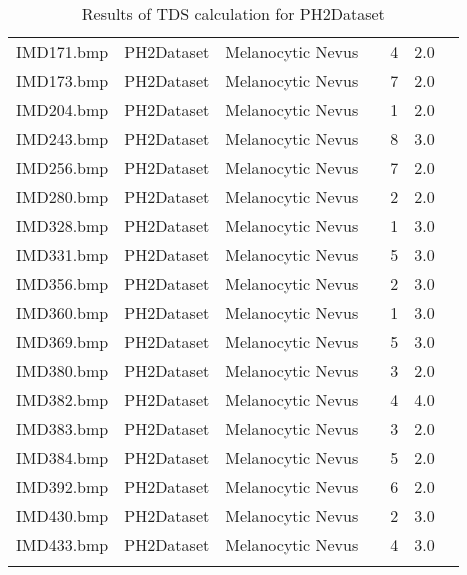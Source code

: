 \begin{longtable}{ | l | l | l | l | l | l | l |}
IMD171.bmp & PH2Dataset & Melanocytic Nevus & & 4 & 2.0 & \\
IMD173.bmp & PH2Dataset & Melanocytic Nevus & & 7 & 2.0 & \\
IMD204.bmp & PH2Dataset & Melanocytic Nevus & & 1 & 2.0 & \\
IMD243.bmp & PH2Dataset & Melanocytic Nevus & & 8 & 3.0 & \\
IMD256.bmp & PH2Dataset & Melanocytic Nevus & & 7 & 2.0 & \\
IMD280.bmp & PH2Dataset & Melanocytic Nevus & & 2 & 2.0 & \\
IMD328.bmp & PH2Dataset & Melanocytic Nevus & & 1 & 3.0 & \\
IMD331.bmp & PH2Dataset & Melanocytic Nevus & & 5 & 3.0 & \\
IMD356.bmp & PH2Dataset & Melanocytic Nevus & & 2 & 3.0 & \\
IMD360.bmp & PH2Dataset & Melanocytic Nevus & & 1 & 3.0 & \\
IMD369.bmp & PH2Dataset & Melanocytic Nevus & & 5 & 3.0 & \\
IMD380.bmp & PH2Dataset & Melanocytic Nevus & & 3 & 2.0 & \\
IMD382.bmp & PH2Dataset & Melanocytic Nevus & & 4 & 4.0 & \\
IMD383.bmp & PH2Dataset & Melanocytic Nevus & & 3 & 2.0 & \\
IMD384.bmp & PH2Dataset & Melanocytic Nevus & & 5 & 2.0 & \\
IMD392.bmp & PH2Dataset & Melanocytic Nevus & & 6 & 2.0 & \\
IMD430.bmp & PH2Dataset & Melanocytic Nevus & & 2 & 3.0 & \\
IMD433.bmp & PH2Dataset & Melanocytic Nevus & & 4 & 3.0 & \\
\hline

\caption{Results of TDS calculation for PH2Dataset}
\label{fig:tds_results_ph2}
\end{longtable}